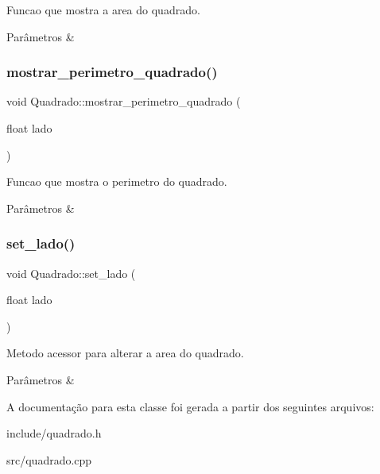 Funcao que mostra a area do quadrado. 


\begin{DoxyParams}{Parâmetros}
{\em } & \\
\hline
\end{DoxyParams}
\mbox{\label{classQuadrado_a14e714f50852960cb6a7059bbdbcb390}} 
\subsubsection{\texorpdfstring{mostrar\+\_\+perimetro\+\_\+quadrado()}{mostrar\_perimetro\_quadrado()}}
{\footnotesize\ttfamily void Quadrado\+::mostrar\+\_\+perimetro\+\_\+quadrado (\begin{DoxyParamCaption}\item[{float}]{lado }\end{DoxyParamCaption})}



Funcao que mostra o perimetro do quadrado. 


\begin{DoxyParams}{Parâmetros}
{\em } & \\
\hline
\end{DoxyParams}
\mbox{\label{classQuadrado_aecf8499d73d86b3f6fe292038d450eb0}} 
\subsubsection{\texorpdfstring{set\+\_\+lado()}{set\_lado()}}
{\footnotesize\ttfamily void Quadrado\+::set\+\_\+lado (\begin{DoxyParamCaption}\item[{float}]{lado }\end{DoxyParamCaption})}



Metodo acessor para alterar a area do quadrado. 


\begin{DoxyParams}{Parâmetros}
{\em } & \\
\hline
\end{DoxyParams}


A documentação para esta classe foi gerada a partir dos seguintes arquivos\+:\begin{DoxyCompactItemize}
\item 
include/quadrado.\+h\item 
src/quadrado.\+cpp\end{DoxyCompactItemize}

